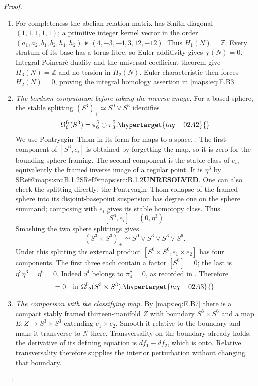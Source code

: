 \documentclass[11pt,a4paper]{article}
\makeatletter
\numberwithin{equation}{section}
\theoremstyle{definition}
\newcommand{\SeriesRefText}[1]{\ifcsname SRef@#1\endcsname\csname SRef@#1\endcsname\else\textbf{UNRESOLVED}\fi}
\newcommand{\SeriesRef}[1]{\ifmmode\text{\SeriesRefText{#1}}\else\SeriesRefText{#1}\fi}
\makeatother
\begin{document}
\begin{proof}
\begin{enumerate}[label=\arabic*.,leftmargin=*]
\item For completeness the abelian relation matrix has Smith
diagonal $(1,1,1,1,1)$; a primitive integer kernel vector in
the order $(a_1,a_2,b_1,b_2,h_1,h_2)$ is
$(4,-3,-4,3,12,-12)$. Thus $H_1(N)=\mathbb Z$.
Every stratum of its base has a torus fibre, so Euler
additivity gives $\chi(N)=0$. Integral Poincar\'e duality and
the universal coefficient theorem give $H_3(N)=\mathbb Z$
and no torsion in $H_2(N)$. Euler characteristic then forces
$H_2(N)=0$, proving the integral homology assertion in \eqref{maps:eq:E.B3}.

\item \emph{The bordism computation before taking the inverse image.}
For a based sphere, the stable splitting
$(S^3)_+\simeq S^0\vee S^3$ identifies
\begin{equation}
 \Omega^{\mathrm{fr}}_6(S^3)
       =\pi^{\mathrm S}_6\oplus\pi^{\mathrm S}_3.
 \hypertarget{tag-02A2}{}\label{maps:eq:E.B6}
\end{equation}
We use Pontryagin--Thom in its form for maps to a space,
\cite[Definition 8.16 and Theorem 8.17]{rootDavisKirk01}.
The first component of $[S^6,e_i]$ is obtained by forgetting
the map, so it is zero for the bounding sphere framing.
The second component is the stable class of $e_i$, equivalently
the framed inverse image of a regular point. It is $\eta^3$
by \SeriesRef{maps:src:B.1.2}. One can also check the splitting directly: the
Pontryagin--Thom collapse of the framed sphere into its
disjoint-basepoint suspension has degree one on the sphere
summand; composing with $e_i$ gives its stable homotopy class.
Thus
\[
                         [S^6,e_i]=(0,\eta^3).
\]
Smashing the two sphere splittings gives
\[
 (S^3\times S^3)_+\simeq
       S^0\vee S^3\vee S^3\vee S^6.
\]
Under this splitting the external product
$[S^6\times S^6,e_1\times e_2]$ has four components.
The first three each contain a factor $[S^6]=0$; the last
is $\eta^3\eta^3=\eta^6=0$. Indeed $\eta^4$ belongs to
$\pi^{\mathrm S}_4=0$, as recorded in
\cite[Corollary~1.3 and Table~1, pp.~112--113]{IsaksenWangXu2023}. Therefore
\begin{equation}
 [S^6\times S^6,e_1\times e_2]=0
      \quad\hbox{in }\Omega^{\mathrm{fr}}_{12}(S^3\times S^3).
 \hypertarget{tag-02A3}{}\label{maps:eq:E.B7}
\end{equation}


\item \emph{The comparison with the classifying map.}
By \eqref{maps:eq:E.B7} there is a compact stably framed thirteen-manifold
$Z$ with boundary $S^6\times S^6$ and a map
$E:Z\to S^3\times S^3$ extending $e_1\times e_2$.
Smooth it relative to the boundary and make it transverse
to $N$ there. Transversality on the boundary already holds:
the derivative of its defining equation is $df_1-df_2$,
which is onto. Relative transversality therefore supplies
the interior perturbation without changing that boundary.


\end{enumerate}
\end{proof}
\end{document}
